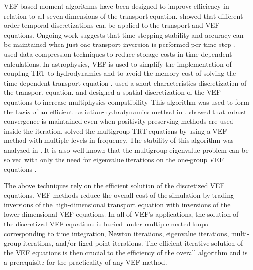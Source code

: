 \documentclass[../doc.tex]{subfiles}
\begin{document}
VEF-based moment algorithms have been designed to improve efficiency in relation to all seven dimensions of the transport equation. 
\textcite{GHASSEMI2020109315} showed that different order temporal discretizations can be applied to the transport and VEF equations. Ongoing work suggests that time-stepping stability and accuracy can be maintained when just one transport inversion is performed per time step \cite{yee_mc21}. \textcite{anistratov2021implicit} used data compression techniques to reduce storage costs in time-dependent calculations. In astrophysics, VEF is used to simplify the implementation of coupling TRT to hydrodynamics and to avoid the memory cost of solving the time-dependent transport equation \cite{Jiang_2012,GNEDIN2001437,GEHMEYR1994320}. 
\textcite{Davis_2012} used a short characteristics discretization of the transport equation. \textcite{me} and \textcite{LOU2019258} designed a spatial discretization of the VEF equations to increase multiphysics compatibility. This algorithm was used to form the basis of an efficient radiation-hydrodynamics method in \cite{LOU2021110393}. \textcite{YEE2020109696} showed that robust convergence is maintained even when positivity-preserving methods are used inside the iteration. 
\textcite{anistratov2020nonlinear} solved the multigroup TRT equations by using a VEF method with multiple levels in frequency. The stability of this algorithm was analyzed in \cite{ANISTRATOV2019186}. It is also well-known that the multigroup eigenvalue problem can be solved with only the need for eigenvalue iterations on the one-group VEF equations \cite{AL}. 

The above techniques rely on the efficient solution of the discretized VEF equations. VEF methods reduce the overall cost of the simulation by trading inversions of the high-dimensional transport equation with inversions of the lower-dimensional VEF equations. In all of VEF's applications, the solution of the discretized VEF equations is buried under multiple nested loops corresponding to time integration, Newton iterations, eigenvalue iterations, multi-group iterations, and/or fixed-point iterations. The efficient iterative solution of the VEF equations is then crucial to the efficiency of the overall algorithm and is a prerequisite for the practicality of any VEF method. 
\end{document}
